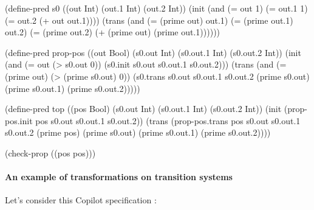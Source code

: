 \begin{code}
(define-pred s0
  ((out Int)
   (out.1 Int)
   (out.2 Int))
  (init
    (and
      (= out 1)
      (= out.1 1)
      (= out.2
        (+ out out.1))))
  (trans
    (and
      (= (prime out) out.1)
      (= (prime out.1) out.2)
      (= (prime out.2)
        (+ (prime out) (prime out.1))))))

(define-pred prop-pos
  ((out Bool)
   (s0.out Int)
   (s0.out.1 Int)
   (s0.out.2 Int))
  (init
    (and
      (= out
        (> s0.out 0))
      (s0.init s0.out s0.out.1 s0.out.2)))
  (trans
    (and
      (= (prime out)
        (> (prime s0.out) 0))
      (s0.trans s0.out s0.out.1 s0.out.2 (prime s0.out) (prime s0.out.1) (prime s0.out.2)))))

(define-pred top
  ((pos Bool)
   (s0.out Int)
   (s0.out.1 Int)
   (s0.out.2 Int))
  (init
    (prop-pos.init pos s0.out s0.out.1 s0.out.2))
  (trans
    (prop-pos.trans pos s0.out s0.out.1 s0.out.2 (prime pos) (prime s0.out) (prime s0.out.1) (prime s0.out.2))))

(check-prop
  ((pos pos)))
\end{code}



\paragraph{An example of transformations on transition systems}


Let's consider this Copilot specification : 

